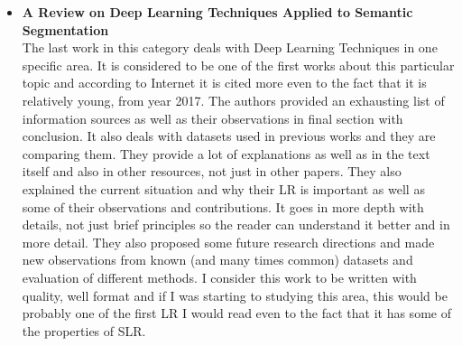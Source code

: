 \begin{itemize}
	\item \textbf{A Review on Deep Learning Techniques Applied to Semantic Segmentation\cite{LR1}} \\
	The last work in this category deals with Deep Learning Techniques in one specific area. It is considered to be one of the first works about this particular topic and according to Internet it is cited more even to the fact that it is relatively young, from year 2017. The authors provided an exhausting list of information sources as well as their observations in final section with conclusion. It also deals with datasets used in previous works and they are comparing them. They provide a lot of explanations as well as in the text itself and also in other resources, not just in other papers. They also explained the current situation and why their LR is important as well as some of their observations and contributions. It goes in more depth with details, not just brief principles so the reader can understand it better and in more detail. They also proposed some future research directions and made new observations from known (and many times common) datasets and evaluation of different methods. I consider this work to be written with quality, well format and if I was starting to studying this area, this would be probably one of the first LR I would read even to the fact that it has some of the properties of SLR.
\end{itemize}

